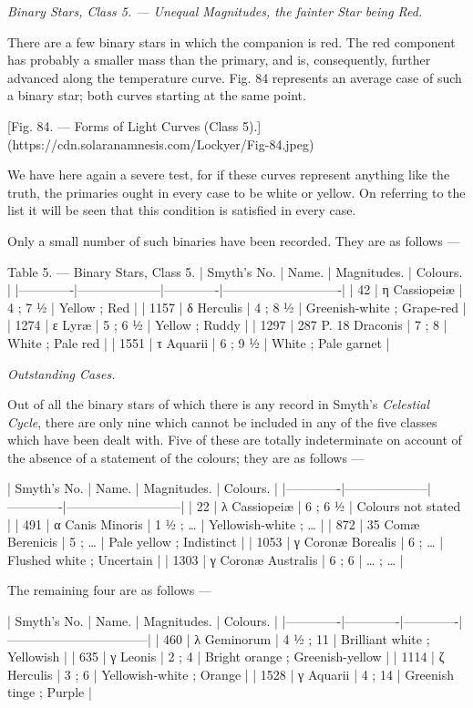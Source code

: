 \documentclass[a4paper, 12pt, oneside, polutonikogreek, english]{article}
\begin{document}
\emph{Binary Stars, Class 5. --- Unequal Magnitudes, the fainter Star being Red.}

There are a few binary stars in which the companion is red. The red component has probably a smaller mass than the primary, and is, consequently, further advanced along the temperature curve. Fig. 84 represents an average case of such a binary star; both curves starting at the same point.

[Fig. 84. --- Forms of Light Curves (Class 5).](https://cdn.solaranamnesis.com/Lockyer/Fig-84.jpeg)

We have here again a severe test, for if these curves represent anything like the truth, the primaries ought in every case to be white or yellow. On referring to the list it will be seen that this condition is satisfied in every case.

Only a small number of such binaries have been recorded. They are as follows ---

Table 5. --- Binary Stars, Class 5. 
| Smyth’s No. | Name.       | Magnitudes. | Colours.          |
|-------------|--------------------|-------------|----------------------------|
| 42     | η Cassiopeiæ    | 4 ; 7 ½   | Yellow ; Red        |
| 1157    | δ Herculis     | 4 ; 8 ½   | Greenish-white ; Grape-red |
| 1274    | ε Lyræ       | 5 ; 6 ½   | Yellow ; Ruddy       |
| 1297    | 287 P. 18 Draconis | 7 ; 8    | White ; Pale red      |
| 1551    | τ Aquarii     | 6 ; 9 ½   | White ; Pale garnet    |

\emph{Outstanding Cases.}

Out of all the binary stars of which there is any record in Smyth's \emph{Celestial Cycle}, there are only nine which cannot be included in any of the five classes which have been dealt with. Five of these are totally indeterminate on account of the absence of a statement of the colours; they are as follows ---

| Smyth’s No. | Name.       | Magnitudes. | Colours.         |
|-------------|--------------------|-------------|---------------------------|
| 22     | λ Cassiopeiæ    | 6 ; 6 ½   | Colours not stated    |
| 491     | α Canis Minoris  | 1 ½ ; …   | Yellowish-white ; …    |
| 872     | 35 Comæ Berenicis | 5 ; …    | Pale yellow ; Indistinct |
| 1053    | γ Coronæ Borealis | 6 ; …    | Flushed white ; Uncertain |
| 1303    | γ Coronæ Australis | 6 ; 6    | … ; …           |

The remaining four are as follows ---

| Smyth’s No. | Name.    | Magnitudes. | Colours.            |
|-------------|-------------|-------------|---------------------------------|
| 460     | λ Geminorum | 4 ½ ; 11  | Brilliant white ; Yellowish   |
| 635     | γ Leonis  | 2 ; 4    | Bright orange ; Greenish-yellow |
| 1114    | ζ Herculis | 3 ; 6    | Yellowish-white ; Orange    |
| 1528    | γ Aquarii  | 4 ; 14   | Greenish tinge ; Purple     |
\end{document}

